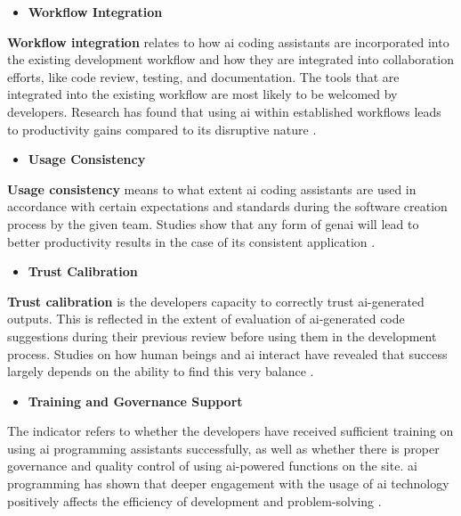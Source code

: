 \begin{itemize}
	\item \textbf{Workflow Integration}
\end{itemize}
\textbf{Workflow integration} relates to how \gls{ai} coding assistants are incorporated into the existing development workflow and how they are integrated into collaboration efforts, like code review, testing, and documentation. The tools that are integrated into the existing workflow are most likely to be welcomed by developers. Research has found that using \gls{ai} within established workflows leads to productivity gains compared to its disruptive nature \autocite{Brynjolfsson2025}.

\begin{itemize}
	\item \textbf{Usage Consistency}
\end{itemize}
\textbf{Usage consistency} means to what extent \gls{ai} coding assistants are used in accordance with certain expectations and standards during the software creation process by the given team. Studies show that any form of \gls{genai} will lead to better productivity results in the case of its consistent application \autocite{Noy2023}.

\begin{itemize}
	\item \textbf{Trust Calibration}
\end{itemize}
\textbf{Trust calibration} is the developers capacity to correctly trust \gls{ai}-generated outputs. This is reflected in the extent of evaluation of \gls{ai}-generated code suggestions during their previous review before using them in the development process. Studies on how human beings and \gls{ai} interact have revealed that success largely depends on the ability to find this very balance \autocite{Noy2023}.

\begin{itemize}
	\item \textbf{Training and Governance Support}
\end{itemize}
The indicator refers to whether the developers have received sufficient training on using \gls{ai} programming assistants successfully, as well as whether there is proper governance and quality control of using \gls{ai}-powered functions on the site. \gls{ai} programming has shown that deeper engagement with the usage of \gls{ai} technology positively affects the efficiency of development and problem-solving \autocite{Brynjolfsson2025}.

